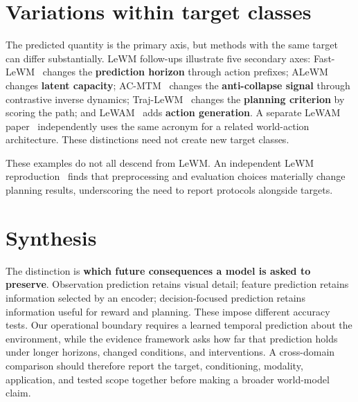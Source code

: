 \IfFileExists{IEEEtran.cls}{\documentclass[journal]{IEEEtran}}{\documentclass[twocolumn]{article}}
\begin{document}
\section{Variations within target classes}\label{variations-within-target-classes}

The predicted quantity is the primary axis, but methods with the same target can differ substantially. LeWM follow-ups illustrate five secondary axes: Fast-LeWM~\cite{ref17} changes the \textbf{prediction horizon} through action prefixes; ALeWM~\cite{ref27} changes \textbf{latent capacity}; AC-MTM~\cite{ref28} changes the \textbf{anti-collapse signal} through contrastive inverse dynamics; Traj-LeWM~\cite{ref29} changes the \textbf{planning criterion} by scoring the path; and LeWAM~\cite{ref24} adds \textbf{action generation}. A separate LeWAM paper~\cite{ref30} independently uses the same acronym for a related world-action architecture. These distinctions need not create new target classes.

These examples do not all descend from LeWM. An independent LeWM reproduction~\cite{ref31} finds that preprocessing and evaluation choices materially change planning results, underscoring the need to report protocols alongside targets.

\section{Synthesis}\label{synthesis}

The distinction is \textbf{which future consequences a model is asked to preserve}. Observation prediction retains visual detail; feature prediction retains information selected by an encoder; decision-focused prediction retains information useful for reward and planning. These impose different accuracy tests. Our operational boundary requires a learned temporal prediction about the environment, while the evidence framework asks how far that prediction holds under longer horizons, changed conditions, and interventions. A cross-domain comparison should therefore report the target, conditioning, modality, application, and tested scope together before making a broader world-model claim.
\end{document}
